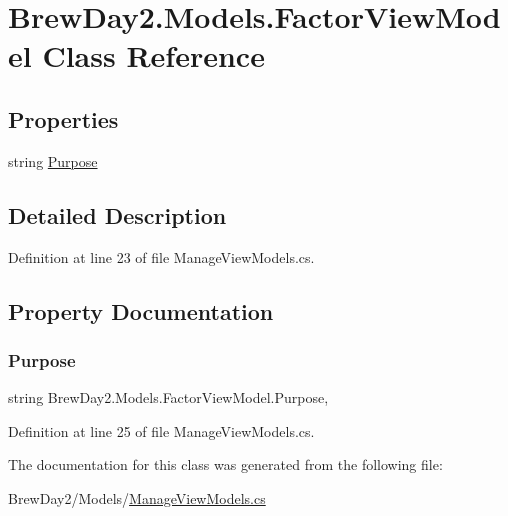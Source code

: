 \hypertarget{class_brew_day2_1_1_models_1_1_factor_view_model}{}\section{Brew\+Day2.\+Models.\+Factor\+View\+Model Class Reference}
\label{class_brew_day2_1_1_models_1_1_factor_view_model}
\subsection*{Properties}
\begin{DoxyCompactItemize}
\item 
string \mbox{\hyperlink{class_brew_day2_1_1_models_1_1_factor_view_model_a5b32ea2c7527804342eb9c6d63c99daf}{Purpose}}
\end{DoxyCompactItemize}


\subsection{Detailed Description}


Definition at line 23 of file Manage\+View\+Models.\+cs.



\subsection{Property Documentation}
\mbox{\label{class_brew_day2_1_1_models_1_1_factor_view_model_a5b32ea2c7527804342eb9c6d63c99daf}} 
\subsubsection{\texorpdfstring{Purpose}{Purpose}}
{\footnotesize\ttfamily string Brew\+Day2.\+Models.\+Factor\+View\+Model.\+Purpose\hspace{0.3cm}{\ttfamily [get]}, {\ttfamily [set]}}



Definition at line 25 of file Manage\+View\+Models.\+cs.



The documentation for this class was generated from the following file\+:\begin{DoxyCompactItemize}
\item 
Brew\+Day2/\+Models/\mbox{\hyperlink{_manage_view_models_8cs}{Manage\+View\+Models.\+cs}}\end{DoxyCompactItemize}
